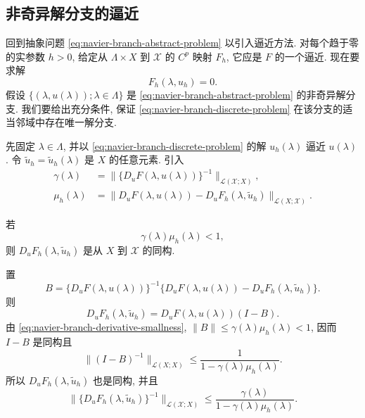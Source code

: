 \subsection{非奇异解分支的逼近}
\label{subsec:navier-nonsingular-branch-approximation}

回到抽象问题 \eqref{eq:navier-branch-abstract-problem} 以引入逼近方法.
对每个趋于零的实参数 $h>0$, 给定从 $\Lambda\times X$ 到 $\mathscr X$ 的
$C^p$ 映射 $F_h$, 它应是 $F$ 的一个逼近. 现在要求解
\begin{equation}\label{eq:navier-branch-discrete-problem}
F_h(\lambda,u_h)=0.
\end{equation}
假设 $\{(\lambda,u(\lambda));\lambda\in\Lambda\}$ 是
\eqref{eq:navier-branch-abstract-problem} 的非奇异解分支. 我们要给出充分条件,
保证 \eqref{eq:navier-branch-discrete-problem} 在该分支的适当邻域中存在唯一解分支.

先固定 $\lambda\in\Lambda$, 并以 \eqref{eq:navier-branch-discrete-problem} 的解
$u_h(\lambda)$ 逼近 $u(\lambda)$. 令 $\widetilde u_h=\widetilde u_h(\lambda)$ 是
$X$ 的任意元素. 引入
\begin{align}
\gamma(\lambda)&=
\|\{D_uF(\lambda,u(\lambda))\}^{-1}\|_{\mathcal L(\mathscr X;X)},
\label{eq:navier-branch-gamma}\\
\mu_h(\lambda)&=
\|D_uF(\lambda,u(\lambda))-D_uF_h(\lambda,\widetilde u_h)\|_{\mathcal L(X;\mathscr X)}.
\label{eq:navier-branch-mu}
\end{align}

\setcounter{statement}{2}
\begin{Lemma}\label{lem:navier-branch-derivative-perturbation}
若
\begin{equation}\label{eq:navier-branch-derivative-smallness}
\gamma(\lambda)\mu_h(\lambda)<1,
\end{equation}
则 $D_uF_h(\lambda,\widetilde u_h)$ 是从 $X$ 到 $\mathscr X$ 的同构.
\end{Lemma}
\begin{Proof}
置
\[
B=\{D_uF(\lambda,u(\lambda))\}^{-1}
\{D_uF(\lambda,u(\lambda))-D_uF_h(\lambda,\widetilde u_h)\}.
\]
则
\[
D_uF_h(\lambda,\widetilde u_h)
=D_uF(\lambda,u(\lambda))(I-B).
\]
由 \eqref{eq:navier-branch-derivative-smallness},
$\|B\|\leq\gamma(\lambda)\mu_h(\lambda)<1$, 因而 $I-B$ 是同构且
\[
\|(I-B)^{-1}\|_{\mathcal L(X;X)}
\leq\frac1{1-\gamma(\lambda)\mu_h(\lambda)}.
\]
所以 $D_uF_h(\lambda,\widetilde u_h)$ 也是同构, 并且
\begin{equation}\label{eq:navier-branch-inverse-perturbation-bound}
\|\{D_uF_h(\lambda,\widetilde u_h)\}^{-1}\|_{\mathcal L(\mathscr X;X)}
\leq\frac{\gamma(\lambda)}{1-\gamma(\lambda)\mu_h(\lambda)}.
\end{equation}
\end{Proof}

